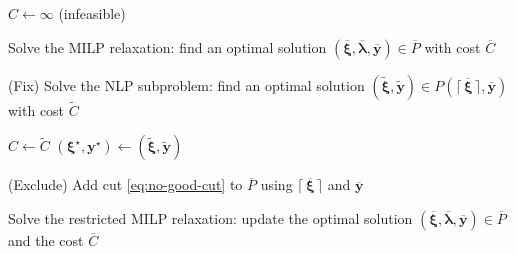 \documentclass[pdflatex,sn-mathphys-num]{sn-jnl}%
\newcommand{\bcom}[1]{\textcolor{olive}{\textbf{Bruno:} #1}}
\newcommand{\new}[1]{#1}
\begin{document}
\begin{algorithm}
\caption{\new{The Relax-Fix-and-Exclude algorithm. We assume the availability of global solvers both for MILP and NLP that return $-\infty$ as cost if the problem is unbounded and $\infty$ if the problem is infeasible.}}\label{alg:algorithm}
\begin{algorithmic}[1]
    
    \State $C \gets  \infty$ (infeasible)
    
    \State Solve the MILP relaxation: find an optimal solution $(\overline{\bm{\xi}},\overline{\bm{\lambda}},\overline{\bm{y}})\in \overline{P}$ with cost $\overline{C}$ \label{line:first-milpsolve}
    
        \State (Fix) Solve the NLP subproblem: find an optimal solution $(\widetilde{\bm{\xi}},\widetilde{\bm{y}})\in P(\lceil \,\overline{\bm{\xi}}\, \rceil ,\overline{\bm{y}})$ with cost $\widetilde{C}$ \label{line:fix}

    	 \label{line:updateCtilde:begin}
    	    \State $C \gets \widetilde{C}$ 
    	    \State $(\bm{\xi}^\star, \bm{y}^{\star}) \gets (\widetilde{\bm{\xi}},\widetilde{\bm{y}})$ 
        \EndIf \label{line:updateCtilde:end}
    
    	\State (Exclude) Add cut \eqref{eq:no-good-cut} to $\overline{P}$ using $\lceil \,\overline{\bm{\xi}}\, \rceil$ and $\overline{\bm{y}}$   \label{line:cut}
        
        \State Solve the restricted MILP relaxation: update the optimal solution $(\overline{\bm{\xi}},\overline{\bm{\lambda}},\overline{\bm{y}})\in \overline{P}$ and the cost $\overline{C}$ \label{line:milpsolver}
    \EndWhile

    \EndIf
\end{algorithmic}
\end{algorithm}

\end{document}
